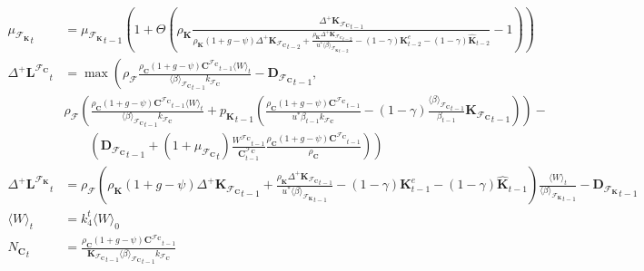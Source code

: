 \documentclass[a4paper, headings=standardclasses]{scrartcl}
\numberwithin{equation}{subsection}
\begin{document}
{\begin{align}
		{\mu_{\mathcal{F}_\mathbf{K}}}_t                  & = {\mu_{\mathcal{F}_\mathbf{K}}}_{t-1}\left(1+ \Theta \left(\rho_\mathbf{K} \frac{{\Delta^+\mathbf{K}_{\mathcal{F}_\mathbf{C}}}_{t-1}}{\rho_\mathbf{K} (1 + g - \psi){\Delta^+\mathbf{K}_{\mathcal{F}_\mathbf{C}}}_{t-2} + \frac{\rho_\mathbf{K} {\Delta^+\mathbf{K}_{\mathcal{F}_\mathbf{C}}}_{t-2}}{u^* {\langle \beta \rangle_{\mathcal{F}_\mathbf{K}}}_{t-2}} - (1-\gamma) \mathbf{K}^e_{t-2} - (1-\gamma)\hat{\mathbf{K}}_{t-2}} - 1\right) \right) \\
		{\Delta^+{\mathbf{L}^{\mathcal{F}_\mathbf{C}}}}_t & = \max\left(\rho_\mathcal{F} \frac{\rho_\mathbf{C} (1 + g - \psi) {\mathbf{C}^{\mathcal{F}_\mathbf{C}}}_{t-1} \langle W \rangle_t}{{\langle\beta\rangle_{\mathcal{F}_\mathbf{C}}}_{t-1} k_{\mathcal{F}_\mathbf{C}}} - {\mathbf{D}_{\mathcal{F}_\mathbf{C}}}_{t-1}, \right. \\ 
		& \rho_\mathcal{F} \left(\frac{\rho_\mathbf{C} (1 + g - \psi) {\mathbf{C}^{\mathcal{F}_\mathbf{C}}}_{t-1} \langle W \rangle_t}{{\langle\beta\rangle_{\mathcal{F}_\mathbf{C}}}_{t-1} k_{\mathcal{F}_\mathbf{C}}} + {p_\mathbf{K}}_{t-1} \left(\frac{\rho_\mathbf{C} (1 + g - \psi) {\mathbf{C}^{\mathcal{F}_\mathbf{C}}}_{t-1}}{u^* \beta_{t-1} k_{\mathcal{F}_\mathbf{C}}} - (1 - \gamma) \frac{{\langle\beta\rangle_{\mathcal{F}_\mathbf{C}}}_{t-1}}{\beta_{t-1}} {\mathbf{K}_{\mathcal{F}_\mathbf{C}}}_{t-1}\right) \right) - \nonumber \\
		&\qquad \left.\left( {\mathbf{D}_{\mathcal{F}_\mathbf{C}}}_{t-1} + (1+{\mu_{\mathcal{F}_\mathbf{C}}}_t) \frac{{W^{\mathcal{F}_\mathbf{C}}}_{t-1}}{\mathbf{C}^{\mathcal{F}_\mathbf{C}}_{t-1}} \frac{\rho_\mathbf{C} (1 + g - \psi) {\mathbf{C}^{\mathcal{F}_\mathbf{C}}}_{t-1}}{\rho_\mathbf{C}}\right)\right) \nonumber \\
		{\Delta^+{\mathbf{L}^{\mathcal{F}_\mathbf{K}}}}_t & = \rho_\mathcal{F} \left(\rho_\mathbf{K} (1 + g - \psi){\Delta^+\mathbf{K}_{\mathcal{F}_\mathbf{C}}}_{t-1} + \frac{\rho_\mathbf{K} {\Delta^+\mathbf{K}_{\mathcal{F}_\mathbf{C}}}_{t-1}}{u^* {\langle \beta \rangle_{\mathcal{F}_\mathbf{K}}}_{t-1}} - (1-\gamma) \mathbf{K}^e_{t-1} - (1-\gamma)\hat{\mathbf{K}}_{t-1}\right) \frac{\langle W \rangle_t}{{\langle\beta\rangle_{\mathcal{F}_\mathbf{K}}}_{t-1}} - {\mathbf{D}_{\mathcal{F}_\mathbf{K}}}_{t-1} \\
		\langle W \rangle_t & = k_4^t \langle W \rangle_0 \\
		{N_\mathbf{C}}_t & = \frac{\rho_\mathbf{C} (1 + g - \psi) {\mathbf{C}^{\mathcal{F}_\mathbf{C}}}_{t-1}}{{\mathbf{K}_{\mathcal{F}_\mathbf{C}}}_{t-1} {\langle \beta \rangle_{\mathcal{F}_\mathbf{C}}}_{t-1} k_{\mathcal{F}_\mathbf{C}}}\\

\end{align}}
\end{document}

